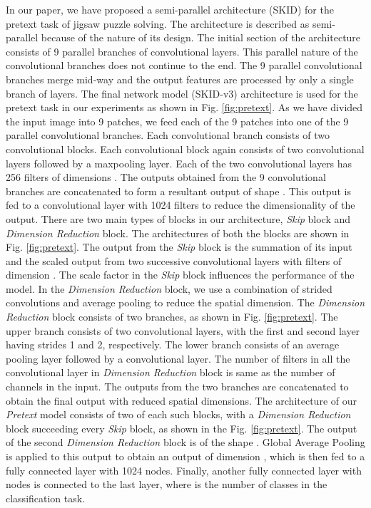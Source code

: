\documentclass[journal]{IEEEtai}
\begin{document}
\indent In our paper, we have proposed a semi-parallel architecture (SKID) for the pretext task of jigsaw puzzle solving. The architecture is described as semi-parallel because of the nature of its design. The initial section of the architecture consists of 9 parallel branches of convolutional layers. This parallel nature of the convolutional branches does not continue to the end. The 9 parallel convolutional branches merge mid-way and the output features are processed by only a single branch of layers. The final network model (SKID-v3) architecture is used for the pretext task in our experiments as shown in Fig. \ref{fig:pretext}. As we have divided the input image into 9 patches, we feed each of the 9 patches into one of the 9 parallel convolutional branches. Each convolutional branch consists of two convolutional blocks. Each convolutional block again consists of two convolutional layers followed by a maxpooling layer. Each of the two convolutional layers has 256 filters of dimensions . The outputs obtained from the 9 convolutional branches are concatenated to form a resultant output of shape . This output is fed to a  convolutional layer with 1024 filters to reduce the dimensionality of the output. There are two main types of blocks in our architecture, \textit{Skip} block and \textit{Dimension Reduction} block. The architectures of both the blocks are shown in Fig. \ref{fig:pretext}. The output from the \textit{Skip} block is the summation of its input and the scaled output from two successive convolutional layers with filters of dimension . The scale factor in the \textit{Skip} block influences the performance of the model. In the \textit{Dimension Reduction} block, we use a combination of strided convolutions and average pooling to reduce the spatial dimension. The \textit{Dimension Reduction} block consists of two branches, as shown in Fig. \ref{fig:pretext}. The upper branch consists of two convolutional layers, with the first and second layer having strides 1 and 2, respectively. The lower branch consists of an average pooling layer followed by a  convolutional layer. The number of filters in all the convolutional layer in \textit{Dimension Reduction} block is same as the number of channels in the input. The outputs from the two branches are concatenated to obtain the final output with reduced spatial dimensions. The architecture of our \textit{Pretext} model consists of two of each such blocks, with a \textit{Dimension Reduction} block succeeding every \textit{Skip} block, as shown in the Fig. \ref{fig:pretext}. The output of the second \textit{Dimension Reduction} block is of the shape . Global Average Pooling is applied to this output to obtain an output of dimension , which is then fed to a  fully connected layer with 1024 nodes. Finally, another fully connected layer with  nodes is connected to the last layer, where  is the number of classes in the classification task.
\end{document}
